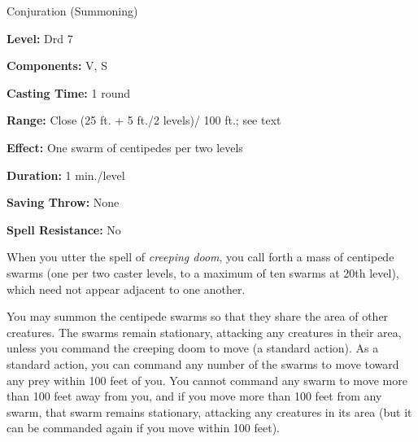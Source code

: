 
Conjuration (Summoning)

\textbf{Level:} Drd 7

\textbf{Components:} V, S

\textbf{Casting Time:} 1 round

\textbf{Range:} Close (25 ft. + 5 ft./2 levels)/ 100 ft.; see text

\textbf{Effect:} One swarm of centipedes per two levels

\textbf{Duration:} 1 min./level

\textbf{Saving Throw:} None

\textbf{Spell Resistance:} No

When you utter the spell of \textit{creeping doom}, you call forth a mass of centipede 
swarms (one per two caster levels, to a maximum of ten swarms at 20th level), which 
need not appear adjacent to one another.

You may summon the centipede swarms so that they share the area of other creatures. 
The swarms remain stationary, attacking any creatures in their area, unless you 
command the creeping doom to move (a standard action). As a standard action, you 
can command any number of the swarms to move toward any prey within 100 feet of 
you. You cannot command any swarm to move more than 100 feet away from you, and 
if you move more than 100 feet from any swarm, that swarm remains stationary, attacking 
any creatures in its area (but it can be commanded again if you move within 100 
feet).

